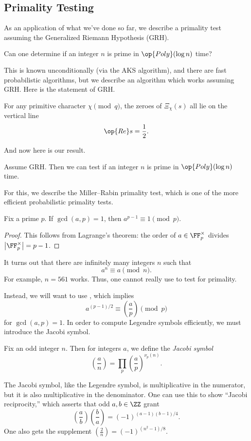 \documentclass[../notes.tex]{subfiles}
\begin{document}
\subsection{Primality Testing}
As an application of what we've done so far, we describe a primality test assuming the Generalized Riemann Hypothesis (GRH).
\begin{ques}
	Can one determine if an integer $n$ is prime in $\op{Poly}(\log n)$ time?
\end{ques}
This is known unconditionally (via the AKS algorithm), and there are fast probabilistic algorithms, but we describe an algorithm which works assuming GRH. Here is the statement of GRH.
\begin{conj}
	For any primitive character $\chi\pmod q$, the zeroes of $\Xi_\chi(s)$ all lie on the vertical line
	\[\op{Re}s=\frac12.\]
\end{conj}
And now here is our result.
\begin{theorem}
	Assume GRH. Then we can test if an integer $n$ is prime in $\op{Poly}(\log n)$ time.
\end{theorem}
For this, we describe the Miller--Rabin primality test, which is one of the more efficient probabilistic primality tests.
\begin{lemma} \label{lem:fermat-little}
	Fix a prime $p$. If $\gcd(a,p)=1$, then $a^{p-1}\equiv1\pmod p$.
\end{lemma}
\begin{proof}
	This follows from Lagrange's theorem: the order of $a\in\FF_p^\times$ divides $\left|\FF_p^\times\right|=p-1$.
\end{proof}
\begin{remark}
	It turns out that there are infinitely many integers $n$ such that
	\[a^n\equiv a\pmod n.\]
	For example, $n=561$ works. Thus, one cannot really use  to test for primality.
\end{remark}
Instead, we will want to use , which implies
\[a^{(p-1)/2}\equiv\left(\frac ap\right)\pmod p\]
for $\gcd(a,p)=1$. In order to compute Legendre symbols efficiently, we must introduce the Jacobi symbol.
\begin{definition}[Jacobi]
	Fix an odd integer $n$. Then for integers $a$, we define the \textit{Jacobi symbol}
	\[\left(\frac an\right)=\prod_p\left(\frac ap\right)^{\nu_p(n)}.\]
\end{definition}
\begin{remark} \label{rem:jacobi-recip}
	The Jacobi symbol, like the Legendre symbol, is multiplicative in the numerator, but it is also multiplicative in the denominator. One can use this to show ``Jacobi reciprocity,'' which asserts that odd $a,b\in\ZZ$ grant
	\[\left(\frac ab\right)\left(\frac ba\right)=(-1)^{(a-1)(b-1)/4}.\]
	One also gets the supplement $\left(\frac2n\right)=(-1)^{\left(n^2-1\right)/8}$.
\end{remark}
\end{document}
